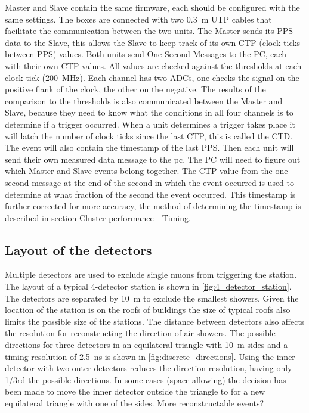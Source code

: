 Master and Slave contain the same firmware, each should be configured
with the same settings. The boxes are connected with two
\SI{0.3}{\meter} UTP cables that facilitate the communication between
the two units. The Master sends its PPS data to the Slave, this allows
the Slave to keep track of its own CTP (clock ticks between PPS) values.
Both units send One Second Messages to the PC, each with their own CTP
values. All \adc values are checked against the thresholds at each clock
tick (\SI{200}{\mega\hertz}). Each channel has two ADCs, one checks the
signal on the positive flank of the clock, the other on the negative.
The results of the comparison to the thresholds is also communicated
between the Master and Slave, because they need to know what the
conditions in all four channels is to determine if a trigger occurred.
When a unit determines a trigger takes place it will latch the number of
clock ticks since the last CTP, this is called the CTD. The event will
also contain the timestamp of the last PPS. Then each unit will send
their own measured data message to the pc. The PC will need to figure
out which Master and Slave events belong together. The CTP value from
the one second message at the end of the second in which the event
occurred is used to determine at what fraction of the second the
event occurred. This timestamp is further corrected for more accuracy, the method of determining the \gps timestamp is described in section Cluster performance - Timing.


\subsection{Layout of the detectors}

Multiple detectors are used to exclude single muons from triggering the station. The layout of a  typical 4-detector station is shown in \cref{fig:4_detector_station}. The detectors are separated by \SI{10}{\meter} to exclude the smallest showers. Given the location of the station is on the roofs of buildings the size of typical roofs also limits the possible size of the stations. The distance between detectors also affects the resolution for reconstructing the direction of air showers. The possible directions for three detectors in an equilateral triangle with \SI{10}{\meter} sides and a timing resolution of \SI{2.5}{\ns} is shown in \cref{fig:discrete_directions}. Using the inner detector with two outer detectors reduces the direction resolution, having only 1/3rd the possible directions. In some cases (space allowing) the decision has been made to move the inner detector outside the triangle to for a new equilateral triangle with one of the sides. More reconstructable events?


